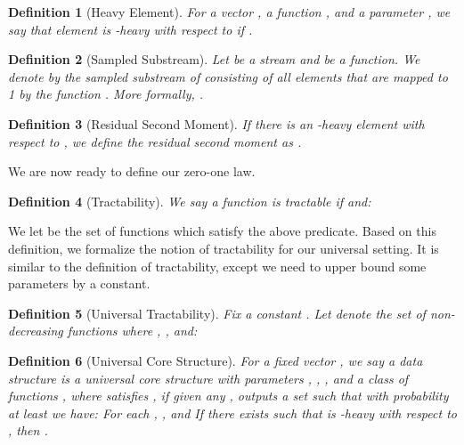 \documentclass[11pt]{article}
\newtheorem{defn}{Definition}
\begin{document}
\begin{defn}[Heavy Element]
For a vector , a function , and a parameter , we say that element  is -heavy with respect to  if
.
\end{defn}

\begin{defn}[Sampled Substream]
Let  be a stream and  be a function.  We denote by  the sampled substream of  consisting of
all elements that are mapped to 1 by the function .  More formally, .
\end{defn}

\begin{defn}[Residual Second Moment]
If there is an -heavy element  with respect to , we define the residual second moment as
.
\end{defn}


We are now ready to define our zero-one law.
\begin{defn}[Tractability]\label{defn:tractability}
We say a function  is tractable if  and:

\vspace{1mm}

\vspace{-4mm}

\vspace{-2mm}


\end{defn}
We let  be the set of functions which satisfy the above predicate.
Based on this definition, we formalize the notion of tractability for our universal setting.  It is similar to the definition of tractability,
except we need to upper bound some parameters by a constant.

\begin{defn}[Universal Tractability]\label{defn:utractability}
Fix a constant .  Let  denote the set of non-decreasing functions  where ,
, and:

\vspace{1mm}

\vspace{-4mm}

\vspace{-2mm}


\end{defn}

\begin{defn}[Universal Core Structure]\label{defn:ucs}
For a fixed vector , we say a data structure  is a universal core structure with
parameters , , , and a class of functions ,
where 
satisfies , if given any ,  outputs a set
 such that with probability at least  we have:
 For each , , and
 If there exists  such that  is -heavy with respect to , then
.
\end{defn}
\end{document}
